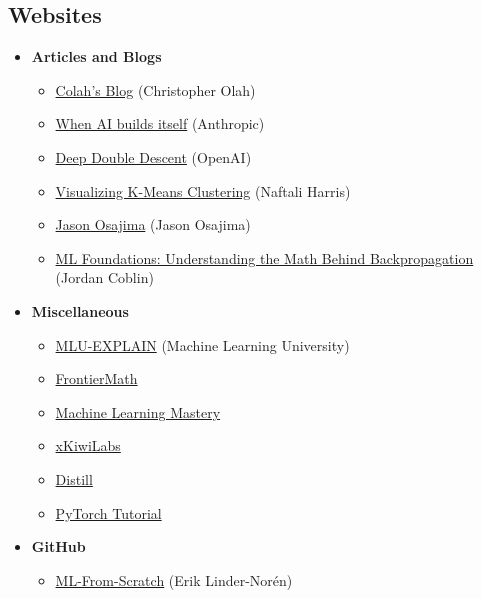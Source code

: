 \documentclass[../../../main.tex]{subfiles}
\begin{document}
\vspace{-0.5\baselineskip}
\subsection*{Websites}
\vspace{-0.5\baselineskip}
\begin{itemize}[noitemsep]
\item \textbf{Articles and Blogs}
\begin{itemize}[noitemsep]
\item
\href{https://colah.github.io/}{Colah's Blog} (Christopher Olah)
\item
\href{https://www.anthropic.com/institute/recursive-self-improvement}{When AI builds itself} (Anthropic)
\item
\href{https://openai.com/index/deep-double-descent/}{Deep Double Descent} (OpenAI)
\item
\href{https://www.naftaliharris.com/blog/visualizing-k-means-clustering/}{Visualizing K-Means Clustering}
(Naftali Harris)
\item
\href{https://www.jasonosajima.com/}{Jason Osajima} (Jason Osajima)
\item
\href{https://jordancoblin.github.io/posts/understanding-the-math-behind-backpropagation/}{ML Foundations: Understanding the Math Behind Backpropagation}
(Jordan Coblin)
\end{itemize}

\item \textbf{Miscellaneous}
\begin{itemize}[noitemsep]
\item
\href{https://mlu-explain.github.io/}{MLU-EXPLAIN} (Machine Learning University)
\item
\href{https://epoch.ai/frontiermath}{FrontierMath}
\item
\href{https://machinelearningmastery.com/start-here/}{Machine Learning Mastery}
\item
\href{https://www.xkiwilabs.com/}{xKiwiLabs}
\item
\href{https://distill.pub/}{Distill}
\item
\href{https://docs.pytorch.org/tutorials/beginner/basics/intro.html}{PyTorch Tutorial}
\end{itemize}

\item \textbf{GitHub}
\begin{itemize}[noitemsep]
\item
\href{https://github.com/eriklindernoren/ML-From-Scratch}{ML-From-Scratch} (Erik Linder-Norén)
\end{itemize}
\end{itemize}
\end{document}
